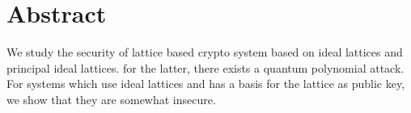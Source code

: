 
\section*{Abstract}
We study the security of lattice based crypto system based on ideal lattices and principal ideal lattices. for the latter, there exists a quantum polynomial attack. For systems which use ideal lattices and has a basis for the lattice as public key, we show that they are somewhat insecure.